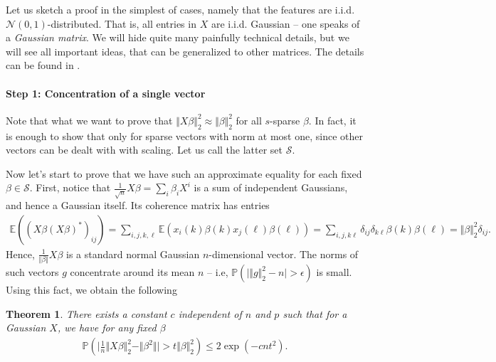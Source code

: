 \documentclass{article}
\newcommand{\calS}{\mathcal{S}}
\newtheorem{theorem}{Theorem}
\newcommand{\abs}[1]{\vert #1 \vert}
\newcommand{\norm}[1]{\Vert #1 \Vert}
\begin{document}
Let us sketch a proof in the simplest of cases, namely that the features are i.i.d. $\mathcal{N}(0,1)$-distributed. That is, all entries in $X$ are i.i.d. Gaussian -- one speaks of a \emph{Gaussian matrix}. We will hide quite many painfully technical details, but we will see all important ideas, that can be generalized to other matrices. The details can be found in \cite[Ch. 9.1]{foucart2011hard}.

\paragraph{Step 1: Concentration of a single vector} Note that what we want to prove that $\norm{X\beta}_2^2 \approx \norm{\beta}_2^2$ for all $s$-sparse $\beta$. In fact, it is enough to show that only for sparse vectors with norm at most one, since other vectors can be dealt with with scaling. Let us call the latter set $\calS$.

Now let's start to prove that we have such an approximate equality for each fixed $\beta\in \calS$. First, notice that $\tfrac{1}{\sqrt{n}} X\beta = \sum_{i} \beta_i X^i$ is a sum of independent Gaussians, and hence a Gaussian itself. Its coherence matrix has entries
\begin{align*}
    \mathbb{E}((X\beta(X\beta)^*)_{ij}) = \sum_{i,j,k,\ell} \mathbb{E}(x_i(k) \beta(k) x_j(\ell) \beta(\ell)) =  \sum_{i,j,k\ell} \delta_{ij}\delta_{k\ell} \beta(k) \beta(\ell) = \norm{\beta}_2^2 \delta_{ij}.
\end{align*}
Hence, $\frac{1}{\norm{\beta}}X\beta$ is a standard normal Gaussian $n$-dimensional vector. The norms of such vectors $g$ concentrate around its mean $n$ -- i.e, $\mathbb{P}( \abs{\norm{g}_2^2 - n}> \epsilon)$ is small. Using this fact, we obtain the following
\begin{theorem}
    There exists a constant $c$ independent of $n$ and $p$ such that for a Gaussian $X$, we have for any fixed $\beta$
    \begin{align}
        \mathbb{P}(\abs{\frac{1}{n} \norm{X\beta}_2^2 - \norm{\beta^2}} >t\norm{\beta}^2_2) \leq 2\exp(-cnt^2). \label{eq:conc}
    \end{align}
\end{theorem}
\end{document}
